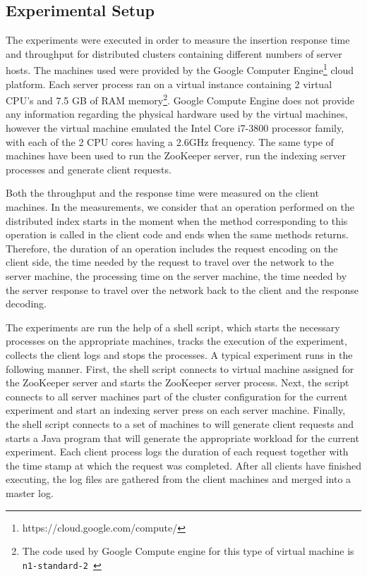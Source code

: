 \documentclass[11pt,a4paper]{globis-book}
\begin{document}
\subsection{Experimental Setup}
The experiments were executed in order to measure the insertion response time and throughput for distributed clusters containing different numbers of server hosts. The machines used were provided by the Google Computer Engine\footnote{https://cloud.google.com/compute/} cloud platform. Each server process ran on a virtual instance containing 2 virtual CPU's and 7.5 GB of RAM memory\footnote{The code used by Google Compute engine for this type of virtual machine is \texttt{n1-standard-2 }}. Google Compute Engine does not provide any information regarding the physical hardware used by the virtual machines, however the virtual machine emulated the Intel Core i7-3800 processor family, with each of the 2 CPU cores having a 2.6GHz frequency. The same type of machines have been used to run the ZooKeeper server, run the indexing server processes and generate client requests. 

Both the throughput and the response time were measured on the client machines. In the measurements, we consider that an operation performed on the distributed index starts in the moment when the method corresponding to this operation is called in the client code and ends when the same methods returns. Therefore, the duration of an operation includes the request encoding on the client side, the time needed by the request to travel over the network to the server machine, the processing time on the server machine, the time needed by the server response to travel over the network back to the client and the response decoding. 

The experiments are run the help of a shell script, which starts the necessary processes on the appropriate machines, tracks the execution of the experiment, collects the client logs and stops the processes. A typical experiment runs in the following manner. First, the shell script connects to virtual machine assigned for the ZooKeeper server and starts the ZooKeeper server process. Next, the script connects to all server machines part of the cluster configuration for the current experiment and start an indexing server press on each server machine. Finally, the shell script connects to a set of machines to will generate client requests and starts a Java program that will generate the appropriate workload for the current experiment. Each client process logs the duration of each request together with the time stamp at which the request was completed. After all clients have finished executing, the log files are gathered from the client machines and merged into a master log. 
\end{document}
